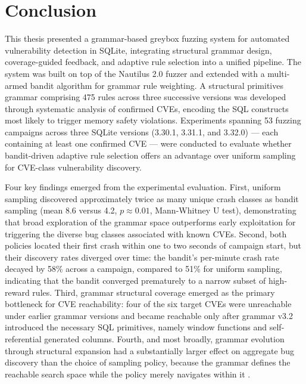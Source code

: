 \chapter*{Conclusion}

This thesis presented a grammar-based greybox fuzzing system for automated vulnerability detection in SQLite, integrating structural grammar design, coverage-guided feedback, and adaptive rule selection into a unified pipeline. The system was built on top of the Nautilus 2.0 fuzzer \cite{nautilus} and extended with a multi-armed bandit algorithm for grammar rule weighting. A structural primitives grammar comprising 475 rules across three successive versions was developed through systematic analysis of confirmed CVEs, encoding the SQL constructs most likely to trigger memory safety violations. Experiments spanning 53 fuzzing campaigns across three SQLite versions (3.30.1, 3.31.1, and 3.32.0) --- each containing at least one confirmed CVE --- were conducted to evaluate whether bandit-driven adaptive rule selection offers an advantage over uniform sampling for CVE-class vulnerability discovery.

Four key findings emerged from the experimental evaluation. First, uniform sampling discovered approximately twice as many unique crash classes as bandit sampling (mean 8.6 versus 4.2, $p \approx 0.01$, Mann-Whitney U test), demonstrating that broad exploration of the grammar space outperforms early exploitation for triggering the diverse bug classes associated with known CVEs. Second, both policies located their first crash within one to two seconds of campaign start, but their discovery rates diverged over time: the bandit's per-minute crash rate decayed by 58\% across a campaign, compared to 51\% for uniform sampling, indicating that the bandit converged prematurely to a narrow subset of high-reward rules. Third, grammar structural coverage emerged as the primary bottleneck for CVE reachability: four of the six target CVEs were unreachable under earlier grammar versions and became reachable only after grammar v3.2 introduced the necessary SQL primitives, namely window functions and self-referential generated columns. Fourth, and most broadly, grammar evolution through structural expansion had a substantially larger effect on aggregate bug discovery than the choice of sampling policy, because the grammar defines the reachable search space while the policy merely navigates within it \cite{superion, nautilus}.

